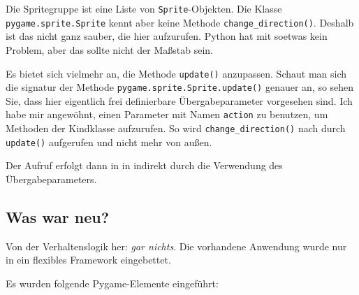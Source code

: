 Die Spritegruppe ist eine Liste von \texttt{Sprite}-Objekten. Die Klasse \texttt{pygame.sprite.Sprite} kennt aber keine Methode \texttt{change\_direction()}. Deshalb ist das nicht ganz sauber, die hier aufzurufen. Python hat mit soetwas kein Problem, aber das sollte nicht der Maßstab sein. 

Es bietet sich vielmehr an, die Methode \texttt{update()} anzupassen. Schaut man sich die \gls{signatur} der Methode \texttt{pygame.sprite.Sprite.update()} genauer an, so sehen Sie, dass hier eigentlich frei definierbare Übergabeparameter vorgesehen sind.  Ich habe mir angewöhnt, einen Parameter mit Namen \texttt{action} zu benutzen, um Methoden der Kindklasse aufzurufen. So wird \texttt{change\_direction()} nach  durch \texttt{update()} aufgerufen und nicht mehr von außen.


Der Aufruf erfolgt dann in  in  indirekt durch die Verwendung des Übergabeparameters.


\subsection*{Was war neu?}

Von der Verhaltenslogik her: \emph{gar nichts}. Die vorhandene Anwendung wurde nur in ein flexibles Framework eingebettet. 

Es wurden folgende Pygame-Elemente eingeführt:

